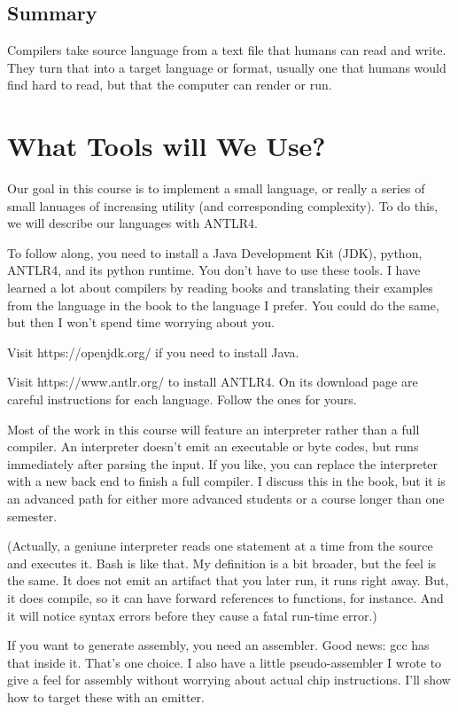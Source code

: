 \subsection{Summary}

Compilers take source language from a text file that humans can read
and write. They turn that into a target language or format, usually
one that humans would find hard to read, but that the computer can
render or run.

\section{What Tools will We Use?}

Our goal in this course is to implement a small language, or really
a series of small lanuages of increasing utility (and corresponding
complexity). To do this, we will describe our languages with ANTLR4.

To follow along, you need to install a Java Development Kit (JDK),
python, ANTLR4, and its python runtime. You don't have to use these tools.
I have learned a lot about compilers by reading books and translating
their examples from the language in the book to the language I prefer.
You could do the same, but then I won't spend time worrying about you.

Visit https://openjdk.org/ if you need to install Java.

Visit https://www.antlr.org/ to install ANTLR4. On its download page
are careful instructions for each language. Follow the ones for yours.

Most of the work in this course will feature an interpreter rather than
a full compiler. An interpreter doesn't emit an executable or byte codes,
but runs immediately after parsing the input. If you like, you can
replace the interpreter with a new back end to finish a full compiler.
I discuss this in the book, but it is an advanced path for either
more advanced students or a course longer than one semester.

(Actually, a geniune interpreter reads one statement at a time from
the source and executes it. Bash is like that. My definition is
a bit broader, but the feel is the same. It does not emit an artifact
that you later run, it runs right away. But, it does compile, so it
can have forward references to functions, for instance. And it will
notice syntax errors before they cause a fatal run-time error.)

If you want to generate assembly, you need an assembler. Good news:
gcc has that inside it. That's one choice. I also have a little
pseudo-assembler I wrote to give a feel for assembly without worrying
about actual chip instructions. I'll show how to target these with
an emitter.

